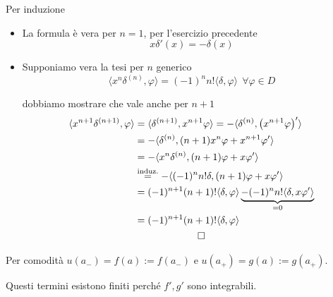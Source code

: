 Per induzione
\begin{itemize}
\item La formula è vera per $n=1$, per l'esercizio precedente\begin{equation*}
x\delta '( x) =-\delta ( x)
\end{equation*}
\item Supponiamo vera la tesi per $n$ generico\begin{equation*}
\langle x^{n} \delta ^{( n)} ,\varphi \rangle =( -1)^{n} n!\langle \delta ,\varphi \rangle \ \ \forall \varphi \in D
\end{equation*}

dobbiamo mostrare che vale anche per $n+1$\begin{gather*}
\begin{aligned}
\langle x^{n+1} \delta ^{( n+1)} ,\varphi \rangle  & =\langle \delta ^{( n+1)} ,x^{n+1} \varphi \rangle =-\langle \delta ^{( n)} ,\left( x^{n+1} \varphi \right) '\rangle \\
 & =-\langle \delta ^{( n)} ,( n+1) x^{n} \varphi +x^{n+1} \varphi '\rangle \\
 & =-\langle x^{n} \delta ^{( n)} ,( n+1) \varphi +x\varphi '\rangle \\
 & \overset{\text{induz.}}{=} -\langle ( -1)^{n} n!\delta ,( n+1) \varphi +x\varphi '\rangle \\
 & =( -1)^{n+1}( n+1) !\langle \delta ,\varphi \rangle \underbrace{-( -1)^{n} n!\langle \delta ,x\varphi '\rangle }_{=0}\\
 & =( -1)^{n+1}( n+1) !\langle \delta ,\varphi \rangle 
\end{aligned}\\
\qed 
\end{gather*}
\end{itemize}
\Soluzione

Per comodità $u( a_{-}) =f( a) :=f( a_{-})$ e $u( a_{+}) =g( a) :=g( a_{+})$.

Questi termini esistono finiti perché $f',g'$ sono integrabili.

